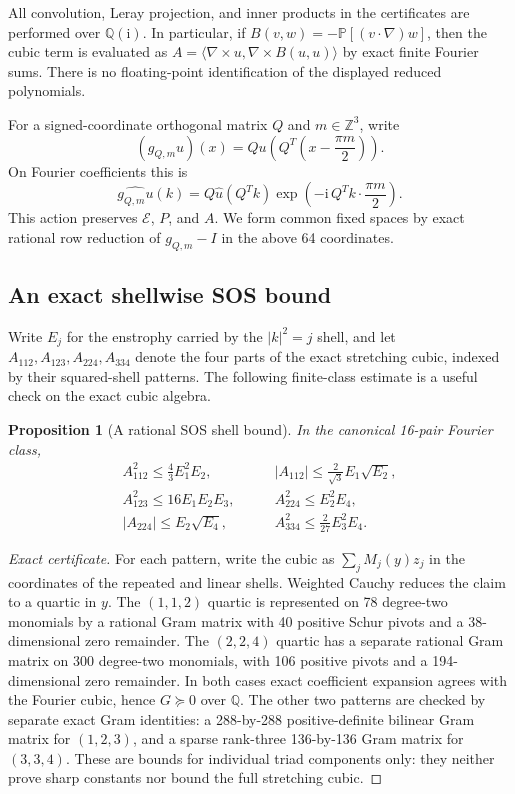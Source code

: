 \documentclass[11pt]{article}
\newtheorem{proposition}[theorem]{Proposition}
\newcommand{\E}{\mathcal{E}}
\begin{document}
All convolution, Leray projection, and inner products in the certificates are
performed over $\mathbb Q(\mathrm{i})$. In particular, if
$B(v,w)=-\mathbb P[(v\cdot\nabla)w]$, then the cubic term is evaluated as
$A=\langle\nabla\times u,\nabla\times B(u,u)\rangle$ by exact finite
Fourier sums. There is no floating-point identification of the displayed
reduced polynomials.

For a signed-coordinate orthogonal matrix $Q$ and $m\in\mathbb Z^3$, write
\[
 (g_{Q,m}u)(x)=Q u\!\left(Q^T\!\left(x-\frac{\pi m}{2}\right)\right).
\]
On Fourier coefficients this is
\[
 \widehat{g_{Q,m}u}(k)=Q\widehat u(Q^Tk)
 \exp\!\left(-\mathrm{i}\,Q^Tk\cdot\frac{\pi m}{2}\right).
\]
This action preserves $\E$, $P$, and $A$. We form common fixed spaces by exact
rational row reduction of $g_{Q,m}-I$ in the above 64 coordinates.

\subsection{An exact shellwise SOS bound}
Write $E_j$ for the enstrophy carried by the $|k|^2=j$ shell, and let
$A_{112},A_{123},A_{224},A_{334}$ denote the four parts of the exact stretching
cubic, indexed by their squared-shell patterns.
The following finite-class
estimate is a useful check on the exact cubic algebra.
\begin{proposition}[A rational SOS shell bound]\label{prop:shell112}
In the canonical 16-pair Fourier class,
\begin{align*}
 A_{112}^2\leq \frac43 E_1^2E_2,
 &\qquad |A_{112}|\leq \frac{2}{\sqrt3}E_1\sqrt{E_2},\\
 A_{123}^2\leq16E_1E_2E_3,
 &\qquad A_{224}^2\leq E_2^2E_4,\\
 |A_{224}|\leq E_2\sqrt{E_4},
 &\qquad A_{334}^2\leq\frac2{27}E_3^2E_4.
\end{align*}
\end{proposition}
\begin{proof}[Exact certificate]
For each pattern, write the cubic as $\sum_j M_j(y)z_j$ in the coordinates of
the repeated and linear shells. Weighted Cauchy reduces the claim to a quartic
in $y$. The $(1,1,2)$ quartic is represented on 78 degree-two monomials by a
rational Gram matrix with 40 positive Schur pivots and a 38-dimensional zero
remainder. The $(2,2,4)$ quartic has a separate rational Gram matrix on 300
degree-two monomials, with 106 positive pivots and a 194-dimensional zero
remainder. In both cases exact coefficient expansion agrees with the Fourier
cubic, hence $G\succeq0$ over $\mathbb Q$. The other two patterns are checked
by separate exact Gram identities: a 288-by-288 positive-definite bilinear
Gram matrix for $(1,2,3)$, and a sparse rank-three 136-by-136 Gram matrix for
$(3,3,4)$. These are bounds for individual triad components only: they neither
prove sharp constants nor bound the full stretching cubic.
\end{proof}
\end{document}
